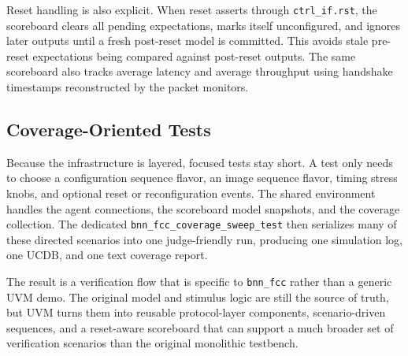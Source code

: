 Reset handling is also explicit. When reset asserts through
\texttt{ctrl\_if.rst}, the scoreboard clears all pending expectations, marks
itself unconfigured, and ignores later outputs until a fresh post-reset model
is committed. This avoids stale pre-reset expectations being compared against
post-reset outputs. The same scoreboard also tracks average latency and average
throughput using handshake timestamps reconstructed by the packet monitors.

\subsection{Coverage-Oriented Tests}

Because the infrastructure is layered, focused tests stay short. A test only
needs to choose a configuration sequence flavor, an image sequence flavor,
timing stress knobs, and optional reset or reconfiguration events. The shared
environment handles the agent connections, the scoreboard model snapshots, and
the coverage collection. The dedicated \texttt{bnn\_fcc\_coverage\_sweep\_test}
then serializes many of these directed scenarios into one judge-friendly run,
producing one simulation log, one UCDB, and one text coverage report.

The result is a verification flow that is specific to \texttt{bnn\_fcc} rather
than a generic UVM demo. The original model and stimulus logic are still the
source of truth, but UVM turns them into reusable protocol-layer components,
scenario-driven sequences, and a reset-aware scoreboard that can support a much
broader set of verification scenarios than the original monolithic testbench.

